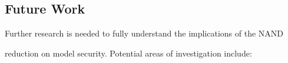 












\subsection{Future Work}













Further research is needed to fully understand the implications of the NAND






reduction on model security. Potential areas of investigation include:













